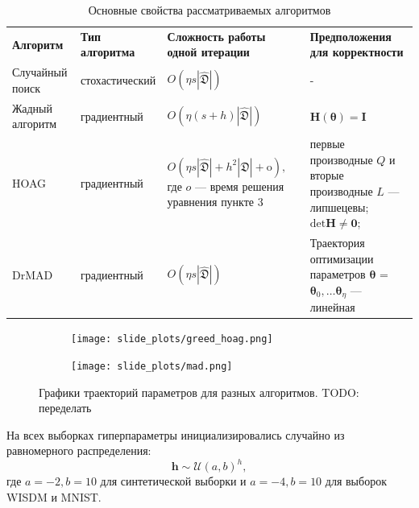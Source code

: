 \documentclass[12pt]{article}
\begin{document}
\begin{table}
\small

\begin{tabularx}{\textwidth}{|X|X|X|X|}
\hline
\bf Алгоритм & \bf Тип алгоритма & \bf Сложность работы одной итерации & \bf Предположения для корректности  \\ 
Случайный поиск & стохастический & $O(\eta s |\hat{\mathfrak{D}}|)$& -  \\ \hline
Жадный алгоритм~\cite{hyper_greed} & градиентный & $O(\eta (s+h) |\hat{\mathfrak{D}}|)$ & $\mathbf{H}(\boldsymbol{\theta}) = \mathbf{I}$  \\ \hline
HOAG~\cite{hyper_hoag} & градиентный & $O(\eta s |\hat{\mathfrak{D}}| + h^2 |\hat{\mathfrak{D}}| + \text{o}),$ где $o$ --- время решения уравнения пункте 3&  первые производные $Q$ и вторые производные $L$ --- липшецевы;  $\text{det}\mathbf{H} \neq \mathbf{0}$;  \\ \hline
DrMAD~\cite{hyper_mad} & градиентный &$O(\eta s |\hat{\mathfrak{D}}|)$ & Траектория оптимизации параметров $\boldsymbol{\theta}$ = $\boldsymbol{\theta}_0, \dots \boldsymbol{\theta}_\eta$ --- линейная \\ \hline
\end{tabularx}

\caption{Основные свойства рассматриваемых алгоритмов}
\label{table:algo_descr}

\end{table}


\begin{figure}

    \begin{subfigure}[b]{0.5\textwidth}
    \texttt{[image: slide\_plots/greed\_hoag.png]}

    \end{subfigure}
    \begin{subfigure}[b]{0.5\textwidth}
    \texttt{[image: slide\_plots/mad.png]}

    \end{subfigure}

  \label{fig:traj}
    \caption{Графики траекторий параметров для разных алгоритмов. TODO: переделать}
    \end{figure}



На всех выборках гиперпараметры инициализировались случайно из равномерного распределения:
\[
    \mathbf{h} \sim \mathcal{U}(a,b)^h,
\]
где $a = -2, b = 10$ для синтетической выборки и $a = -4, b = 10$ для выборок WISDM и MNIST.
\end{document}

